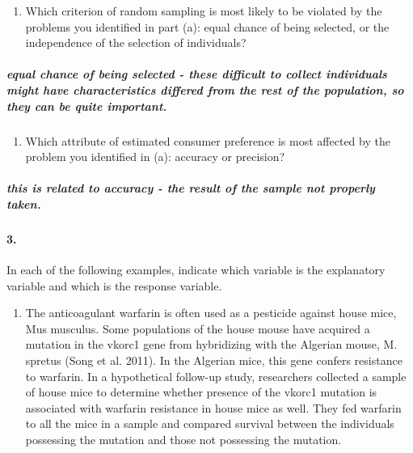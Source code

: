 \documentclass[]{article}
\providecommand{\tightlist}{%
  \setlength{\itemsep}{0pt}\setlength{\parskip}{0pt}}
\let\oldparagraph\paragraph
\renewcommand{\paragraph}[1]{\oldparagraph{#1}\mbox{}}
\let\oldsubparagraph\subparagraph
\renewcommand{\subparagraph}[1]{\oldsubparagraph{#1}\mbox{}}
\begin{document}
\begin{enumerate}
\def\labelenumi{\alph{enumi}.}
\setcounter{enumi}{1}
\tightlist
\item
  Which criterion of random sampling is most likely to be violated by
  the problems you identified in part (a): equal chance of being
  selected, or the independence of the selection of individuals?
\end{enumerate}

\subparagraph{equal chance of being selected - these difficult to
collect individuals might have characteristics differed from the rest of
the population, so they can be quite
important.}\label{equal-chance-of-being-selected---these-difficult-to-collect-individuals-might-have-characteristics-differed-from-the-rest-of-the-population-so-they-can-be-quite-important.}

\begin{enumerate}
\def\labelenumi{\alph{enumi}.}
\setcounter{enumi}{2}
\tightlist
\item
  Which attribute of estimated consumer preference is most affected by
  the problem you identified in (a): accuracy or precision?
\end{enumerate}

\subparagraph{this is related to accuracy - the result of the sample not
properly
taken.}\label{this-is-related-to-accuracy---the-result-of-the-sample-not-properly-taken.}

\paragraph{3.}\label{section-2}

In each of the following examples, indicate which variable is the
explanatory variable and which is the response variable.

\begin{enumerate}
\def\labelenumi{\alph{enumi}.}
\tightlist
\item
  The anticoagulant warfarin is often used as a pesticide against house
  mice, Mus musculus. Some populations of the house mouse have acquired
  a mutation in the vkorc1 gene from hybridizing with the Algerian
  mouse, M. spretus (Song et al. 2011). In the Algerian mice, this gene
  confers resistance to warfarin. In a hypothetical follow-up study,
  researchers collected a sample of house mice to determine whether
  presence of the vkorc1 mutation is associated with warfarin resistance
  in house mice as well. They fed warfarin to all the mice in a sample
  and compared survival between the individuals possessing the mutation
  and those not possessing the mutation.
\end{enumerate}
\end{document}
